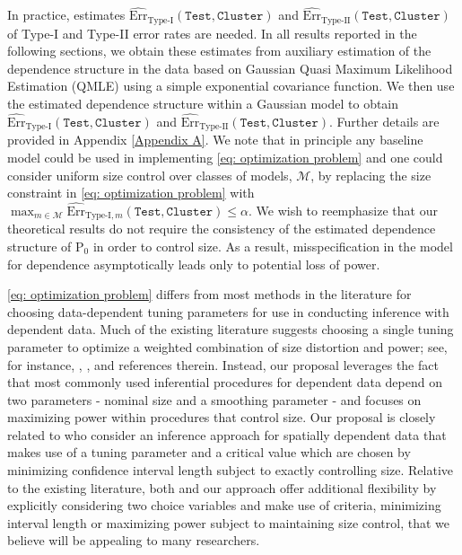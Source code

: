 \documentclass[preprint]{imsart}
\numberwithin{equation}{section}
\theoremstyle{plain}
\theoremstyle{definition}
\renewcommand{\(}{\left(}
\renewcommand{\)}{\right)}
\renewcommand{\[}{\left[}
\renewcommand{\]}{\right]}
\newcommand{\Test}{\mathtt{Test}}
\newcommand{\Cluster}{\mathtt{Cluster}}
\renewcommand{\Pr}{{\mathrm{P}}}
\renewcommand{\leq}{\leqslant}
\begin{document}
{{In practice, estimates $\widehat{\text{Err}}_{\text{Type-I}}(\Test, \Cluster)$ and $\widehat{\text{Err}}_{\text{Type-II}  }(\Test, \Cluster) $ of Type-I and Type-II error rates are needed. In all results reported in the following sections, we obtain these estimates from auxiliary estimation of the dependence structure in the data based on Gaussian Quasi Maximum Likelihood Estimation (QMLE) using a simple exponential covariance function. We then use the estimated dependence structure within a Gaussian model to obtain $\widehat{\text{Err}}_{\text{Type-I}}(\Test, \Cluster)$ and $\widehat{\text{Err}}_{\text{Type-II}  }(\Test, \Cluster)$. Further details are provided in Appendix \ref{Appendix A}. We note that in principle any baseline model could be used in implementing \eqref{eq: optimization problem} and one could consider uniform size control over classes of models, $\mathcal{M}$, by replacing the size constraint in \eqref{eq: optimization problem} with $\max_{m \in \mathcal{M}} \widehat{\text{Err}}_{\text{Type-I},m}(\Test, \Cluster)  \leq \alpha$. We wish to reemphasize that our theoretical results do not require the consistency of the estimated dependence structure of $\Pr_0$ in order to control size. As a result, misspecification in the model for dependence asymptotically leads only to potential loss of power.

\eqref{eq: optimization problem} differs from most methods in the literature for choosing data-dependent tuning parameters for use in conducting inference with dependent data. Much of the existing literature suggests choosing a single tuning parameter to optimize a weighted combination of size distortion and power; see, for instance, \cite{LLS:SizePower}, \cite{Sun2015}, and references therein. Instead, our proposal leverages the fact that most commonly used inferential procedures for dependent data depend on two parameters - nominal size and a smoothing parameter - and focuses on maximizing power within procedures that control size. Our proposal is closely related to \cite{MeullerWatson:2020} who consider an inference approach for spatially dependent data that makes use of a tuning parameter and a critical value which are chosen by minimizing confidence interval length subject to exactly controlling size. Relative to the existing literature, both \cite{MeullerWatson:2020} and our approach offer additional flexibility by explicitly considering two choice variables and make use of criteria, minimizing interval length or maximizing power subject to maintaining size control, that we believe will be appealing to many researchers. 

}}
\end{document}

